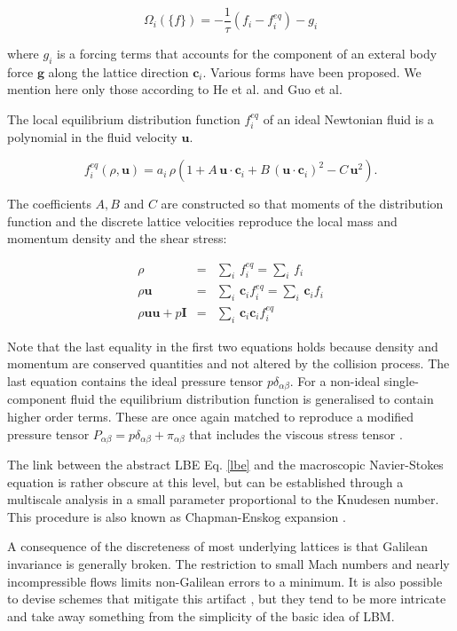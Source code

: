 \documentclass[8.5pt,twoside,twocolumn]{article}
\newcommand{\beq}{\begin{equation}}
\newcommand{\eeq}{\end{equation}}
\newcommand{\beqa}{\begin{eqnarray}}
\newcommand{\eeqa}{\end{eqnarray}}
\begin{document}
\beq
\Omega_i(\{f\}) = -\frac{1}{\tau}\left(f_i - f_i^{eq}\right) - g_i
\eeq

where $g_i$ is a forcing terms that accounts for the component of an 
exteral body force $\mathbf{g}$ along the lattice direction $\mathbf{c}_i$. 
Various forms have been proposed. We mention here only those according to 
He et al. \cite{He:1998} and Guo et al. \cite{Guo:2002} 


The local equilibrium distribution function $f_i^{eq}$ of an ideal Newtonian fluid is a polynomial
in the fluid velocity $\mathbf{u}$.

\beq
f_i^{eq}(\rho, \mathbf{u})=a_i\,\rho\left(1+A\,\mathbf{u}\cdot\mathbf{c}_i + B\,(\mathbf{u}\cdot\mathbf{c}_i)^2- C\,\mathbf{u}^2\right).
\eeq

The coefficients $A, B$ and $C$ are constructed so that moments of the distribution 
function and the discrete lattice velocities reproduce the local mass and momentum density
and the shear stress:

\beqa
\rho &=& \sum_i \, f_i^{eq} = \sum_i \, f_i\\
\rho \mathbf{u} &=& \sum_i \, \mathbf{c}_i f_i^{eq} = \sum_i \, \mathbf{c}_i f_i\\ 
\rho \mathbf{u} \mathbf{u} + p \mathbf{I} &=& \sum_i \, \mathbf{c}_i \mathbf{c}_i f_i^{eq}
\eeqa

Note that the last equality in the first two equations holds because density and momentum are
conserved quantities and not altered by the collision process. The last equation contains
the ideal pressure tensor $p \delta_{\alpha \beta}$. 
For a non-ideal single-component fluid the 
equilibrium distribution function is generalised to contain higher order terms. These 
are once again matched to reproduce a modified pressure tensor  
$P_{\alpha \beta}=p\delta_{\alpha \beta} + \pi_{\alpha \beta}$ that includes the 
viscous stress tensor .

The link between the abstract LBE Eq. \ref{lbe} and the macroscopic Navier-Stokes
equation is rather obscure at this level, but can be established through a multiscale
analysis in a small parameter proportional to the Knudesen number. This procedure is also
known as Chapman-Enskog expansion \cite{Succi:2001, Guo:2013}.

A consequence of the discreteness of most underlying lattices is that Galilean invariance is generally broken.
The restriction to small Mach numbers and nearly incompressible flows limits non-Galilean errors to a minimum.
It is also possible to devise schemes that mitigate this artifact \cite{Chikatamarla:2006, Dellar:2014},
but they tend to be more intricate and take away something from the simplicity of the basic idea of LBM.
\end{document}
